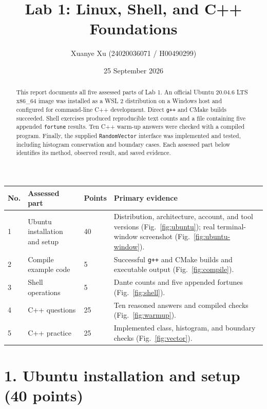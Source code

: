 \documentclass[a4paper,nobib]{tufte-handout}
\title[Lab 1 Report]{Lab 1: Linux, Shell, and C++ Foundations}
\author{Xuanye Xu (24020036071 / H00490299)}
\date{25 September 2026}
\begin{document}
\maketitle
\pagestyle{fancy}
\fancyhf{}
\fancyfoot[C]{\small\thepage}
\renewcommand{\headrulewidth}{0pt}
\thispagestyle{fancy}

\begin{abstract}
This report documents all five assessed parts of Lab 1. An official Ubuntu
20.04.6 LTS x86\_64 image was installed as a WSL 2 distribution on a Windows
host and configured for command-line C++ development. Direct \texttt{g++} and
CMake builds succeeded. Shell exercises produced reproducible text counts and
a file containing five appended \texttt{fortune} results. Ten C++ warm-up
answers were checked with a compiled program. Finally, the supplied
\texttt{RandomVector} interface was implemented and tested, including
histogram conservation and boundary cases. Each assessed part below identifies
its method, observed result, and saved evidence.
\end{abstract}

\begin{fullwidth}
\small
\begin{tabularx}{\linewidth}{@{}p{0.42in}p{1.95in}p{0.7in}X@{}}
\toprule
No. & Assessed part & Points & Primary evidence \\
\midrule
1 & Ubuntu installation and setup & 40 & Distribution, architecture, account, and tool versions (Fig.~\ref{fig:ubuntu}); real terminal-window screenshot (Fig.~\ref{fig:ubuntu-window}). \\
2 & Compile example code & 5 & Successful \texttt{g++} and CMake builds and executable output (Fig.~\ref{fig:compile}). \\
3 & Shell operations & 5 & Dante counts and five appended fortunes (Fig.~\ref{fig:shell}). \\
4 & C++ questions & 25 & Ten reasoned answers and compiled checks (Fig.~\ref{fig:warmup}). \\
5 & C++ practice & 25 & Implemented class, histogram, and boundary checks (Fig.~\ref{fig:vector}). \\
\bottomrule
\end{tabularx}
\end{fullwidth}

\section{1. Ubuntu installation and setup (40 points)}
\end{document}
